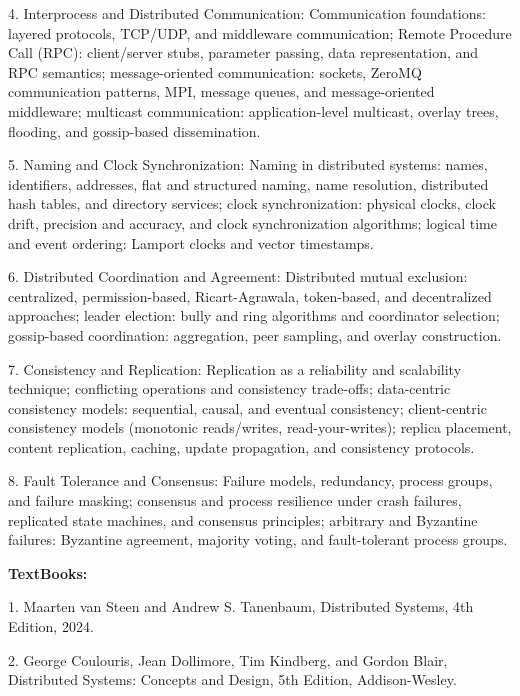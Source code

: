 \documentclass[12pt,a4paper]{article}
\begin{document}
4. Interprocess and Distributed Communication: Communication foundations: layered protocols, TCP/UDP, and middleware communication; Remote Procedure Call (RPC): client/server stubs, parameter passing, data representation, and RPC semantics; message-oriented communication: sockets, ZeroMQ communication patterns, MPI, message queues, and message-oriented middleware; multicast communication: application-level multicast, overlay trees, flooding, and gossip-based dissemination.\par
5. Naming and Clock Synchronization: Naming in distributed systems: names, identifiers, addresses, flat and structured naming, name resolution, distributed hash tables, and directory services; clock synchronization: physical clocks, clock drift, precision and accuracy, and clock synchronization algorithms; logical time and event ordering: Lamport clocks and vector timestamps.\par
6. Distributed Coordination and Agreement: Distributed mutual exclusion: centralized, permission-based, Ricart-Agrawala, token-based, and decentralized approaches; leader election: bully and ring algorithms and coordinator selection; gossip-based coordination: aggregation, peer sampling, and overlay construction.\par
7. Consistency and Replication: Replication as a reliability and scalability technique; conflicting operations and consistency trade-offs; data-centric consistency models: sequential, causal, and eventual consistency; client-centric consistency models (monotonic reads/writes, read-your-writes); replica placement, content replication, caching, update propagation, and consistency protocols.\par
8. Fault Tolerance and Consensus: Failure models, redundancy, process groups, and failure masking; consensus and process resilience under crash failures, replicated state machines, and consensus principles; arbitrary and Byzantine failures: Byzantine agreement, majority voting, and fault-tolerant process groups.\par\vspace{4pt}
\textbf{TextBooks:}\par\vspace{2pt}
1. Maarten van Steen and Andrew S. Tanenbaum, Distributed Systems, 4th Edition, 2024.\par
2. George Coulouris, Jean Dollimore, Tim Kindberg, and Gordon Blair, Distributed Systems: Concepts and Design, 5th Edition, Addison-Wesley.\par
\vspace{4pt}
\end{document}
